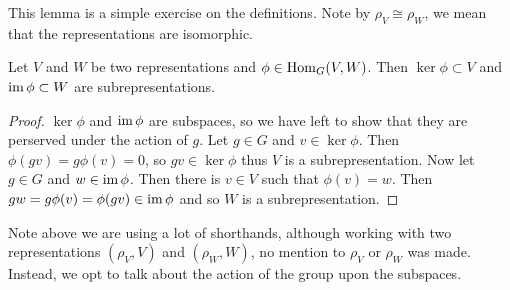 This lemma is a simple exercise on the definitions. Note by $\rho_V \cong \rho_W$, we mean that the representations are isomorphic.

\begin{lemma}
  Let $V$ and $W$ be two representations and $\phi \in \operatorname{Hom}_G(V, W)$. Then $\ker\phi \subset V$ and $\operatorname{im}\phi \subset W$ are subrepresentations.
\end{lemma}

\begin{proof}
  $\ker\phi$ and $\operatorname{im}\phi$ are subspaces, so we have left to show that they are perserved under the action of $g$. Let $g \in G$ and $v \in \ker\phi$. Then $\phi(gv) = g\phi(v) = 0$, so $gv \in \ker\phi$ thus $V$ is a subrepresentation. Now let $g \in G$ and $w \in \operatorname{im}\phi$. Then there is $v \in V$ such that $\phi(v) = w$. Then $gw = g\phi(v)=\phi(gv)\in\operatorname{im}\phi$ and so $W$ is a subrepresentation.
\end{proof}

Note above we are using a lot of shorthands, although working with two representations $(\rho_V, V)$ and $(\rho_W, W)$, no mention to $\rho_V$ or $\rho_W$ was made. Instead, we opt to talk about the action of the group upon the subspaces.

